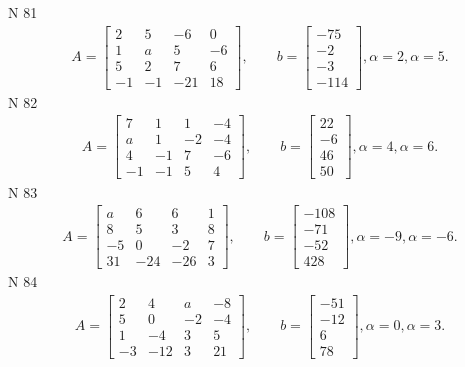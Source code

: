 \documentclass[11pt]{report}
\begin{document}
N 81
\begin{align*}
 A = \left[\begin{matrix}2 & 5 & -6 & 0\\1 & a & 5 & -6\\5 & 2 & 7 & 6\\-1 & -1 & -21 & 18\end{matrix}\right],
    \qquad b = \left[\begin{matrix}-75\\-2\\-3\\-114\end{matrix}\right], \alpha = 2, \alpha = 5. 
 \end{align*}
N 82
\begin{align*}
 A = \left[\begin{matrix}7 & 1 & 1 & -4\\a & 1 & -2 & -4\\4 & -1 & 7 & -6\\-1 & -1 & 5 & 4\end{matrix}\right],
    \qquad b = \left[\begin{matrix}22\\-6\\46\\50\end{matrix}\right], \alpha = 4, \alpha = 6. 
 \end{align*}
N 83
\begin{align*}
 A = \left[\begin{matrix}a & 6 & 6 & 1\\8 & 5 & 3 & 8\\-5 & 0 & -2 & 7\\31 & -24 & -26 & 3\end{matrix}\right],
    \qquad b = \left[\begin{matrix}-108\\-71\\-52\\428\end{matrix}\right], \alpha = -9, \alpha = -6. 
 \end{align*}
N 84
\begin{align*}
 A = \left[\begin{matrix}2 & 4 & a & -8\\5 & 0 & -2 & -4\\1 & -4 & 3 & 5\\-3 & -12 & 3 & 21\end{matrix}\right],
    \qquad b = \left[\begin{matrix}-51\\-12\\6\\78\end{matrix}\right], \alpha = 0, \alpha = 3. 
 \end{align*}
\end{document}
